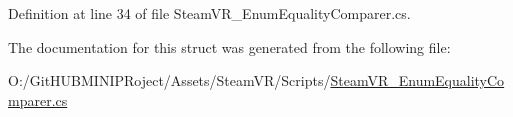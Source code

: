Definition at line 34 of file Steam\+V\+R\+\_\+\+Enum\+Equality\+Comparer.\+cs.



The documentation for this struct was generated from the following file\+:\begin{DoxyCompactItemize}
\item 
O\+:/\+Git\+H\+U\+B\+M\+I\+N\+I\+P\+Roject/\+Assets/\+Steam\+V\+R/\+Scripts/\mbox{\hyperlink{_steam_v_r___enum_equality_comparer_8cs}{Steam\+V\+R\+\_\+\+Enum\+Equality\+Comparer.\+cs}}\end{DoxyCompactItemize}
